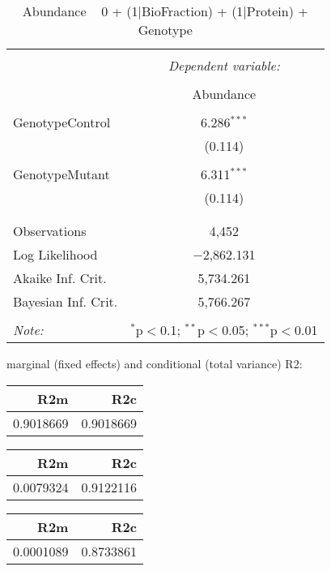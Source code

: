 \documentclass[11pt]{report}
\begin{document}
\begin{table}[!htbp] \centering 
  \caption{Abundance ~ 0 + (1|BioFraction) + (1|Protein) + Genotype} 
  \label{} 
\begin{tabular}{@{\extracolsep{5pt}}lc} 
\\[-1.8ex]\hline 
\hline \\[-1.8ex] 
 & \multicolumn{1}{c}{\textit{Dependent variable:}} \\ 
\cline{2-2} 
\\[-1.8ex] & Abundance \\ 
\hline \\[-1.8ex] 
 GenotypeControl & 6.286$^{***}$ \\ 
  & (0.114) \\ 
  & \\ 
 GenotypeMutant & 6.311$^{***}$ \\ 
  & (0.114) \\ 
  & \\ 
\hline \\[-1.8ex] 
Observations & 4,452 \\ 
Log Likelihood & $-$2,862.131 \\ 
Akaike Inf. Crit. & 5,734.261 \\ 
Bayesian Inf. Crit. & 5,766.267 \\ 
\hline 
\hline \\[-1.8ex] 
\textit{Note:}  & \multicolumn{1}{r}{$^{*}$p$<$0.1; $^{**}$p$<$0.05; $^{***}$p$<$0.01} \\ 
\end{tabular} 
\end{table} 
marginal (fixed effects) and conditional (total variance) R2:

\begin{tabular}{r|r}
\hline
R2m & R2c\\
\hline
0.9018669 & 0.9018669\\
\hline
\end{tabular}

\begin{tabular}{r|r}
\hline
R2m & R2c\\
\hline
0.0079324 & 0.9122116\\
\hline
\end{tabular}

\begin{tabular}{r|r}
\hline
R2m & R2c\\
\hline
0.0001089 & 0.8733861\\
\hline
\end{tabular}
\end{document}
